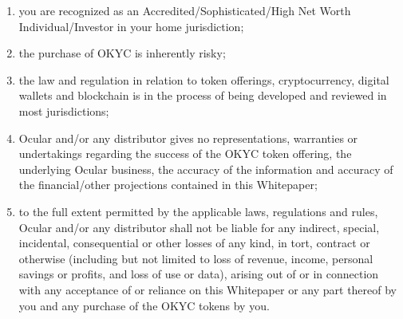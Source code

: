 \documentclass[a4paper]{article}
\begin{document}
\begin{enumerate}
\item you are recognized as an Accredited/Sophisticated/High Net Worth Individual/Investor in your home jurisdiction; 
\item the purchase of OKYC is inherently risky; 
\item the law and regulation in relation to token offerings, cryptocurrency, digital wallets and blockchain is in the process of being developed and reviewed in most jurisdictions;
\item Ocular and/or any distributor gives no representations, warranties or undertakings regarding the success of the OKYC token offering, the underlying Ocular business, the accuracy of the information and accuracy of the financial/other projections contained in this Whitepaper;
\item to the full extent permitted by the applicable laws, regulations and rules, Ocular and/or any distributor shall not be liable for any indirect, special, incidental, consequential or other losses of any kind, in tort, contract or otherwise (including but not limited to loss of revenue, income, personal savings or profits, and loss of use or data), arising out of or in connection with any acceptance of or reliance on this Whitepaper or any part thereof by you and any purchase of the OKYC tokens by you.
\end{enumerate}
\end{document}
